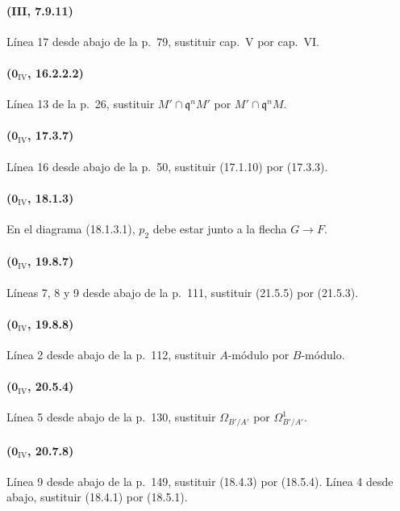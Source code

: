 \paragraph{(III, 7.9.11)}
Línea 17 desde abajo de la p.~79, sustituir cap.~V por cap.~VI.

\paragraph{($\mathbf{0}_{\mathrm{IV}}$, 16.2.2.2)}
Línea 13 de la p.~26, sustituir $M'\cap\mathfrak q^nM'$ por
$M'\cap\mathfrak q^nM$.

\paragraph{($\mathbf{0}_{\mathrm{IV}}$, 17.3.7)}
Línea 16 desde abajo de la p.~50, sustituir (17.1.10) por (17.3.3).

\paragraph{($\mathbf{0}_{\mathrm{IV}}$, 18.1.3)}
En el diagrama (18.1.3.1), $p_2$ debe estar junto a la flecha
$G\to F$.

\paragraph{($\mathbf{0}_{\mathrm{IV}}$, 19.8.7)}
Líneas 7, 8 y 9 desde abajo de la p.~111, sustituir (21.5.5) por (21.5.3).

\paragraph{($\mathbf{0}_{\mathrm{IV}}$, 19.8.8)}
Línea 2 desde abajo de la p.~112, sustituir $A$-módulo por $B$-módulo.

\paragraph{($\mathbf{0}_{\mathrm{IV}}$, 20.5.4)}
Línea 5 desde abajo de la p.~130, sustituir $\Omega_{B'/A'}$ por
$\Omega^1_{B'/A'}$.

\paragraph{($\mathbf{0}_{\mathrm{IV}}$, 20.7.8)}
Línea 9 desde abajo de la p.~149, sustituir (18.4.3) por (18.5.4). Línea 4
desde abajo, sustituir (18.4.1) por (18.5.1).

